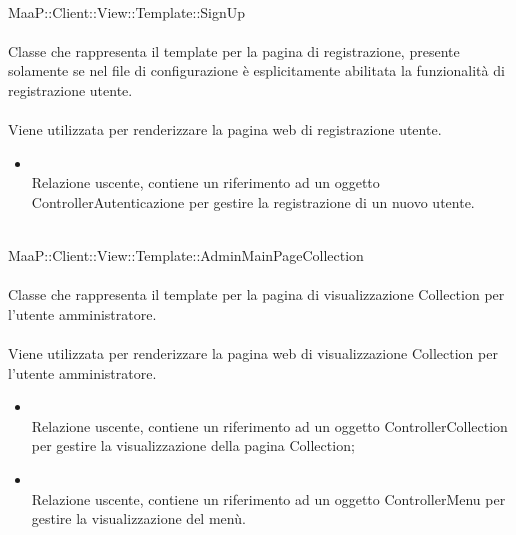 	\\
	MaaP::Client::View::Template::SignUp\\
	\\
	Classe che rappresenta il template per la pagina di registrazione, presente solamente se nel file di configurazione è esplicitamente abilitata la funzionalità di registrazione utente.\\
	\\
	Viene utilizzata per renderizzare la pagina web di registrazione utente.
	\begin{itemize}
	\item{}\\
	Relazione uscente, contiene un riferimento ad un oggetto ControllerAutenticazione per gestire la registrazione di un nuovo utente.
	\end{itemize}

	\\
	MaaP::Client::View::Template::AdminMainPageCollection\\
	\\
	Classe che rappresenta il template per la pagina di visualizzazione Collection per l'utente amministratore.\\
	\\
	Viene utilizzata per renderizzare la pagina web di visualizzazione Collection per l'utente amministratore.\\
	\begin{itemize}
	\item{}\\
	Relazione uscente, contiene un riferimento ad un oggetto ControllerCollection per gestire la visualizzazione della pagina Collection;
	\item{}\\
	Relazione uscente, contiene un riferimento ad un oggetto ControllerMenu per gestire la visualizzazione del menù.
	\end{itemize}
	
